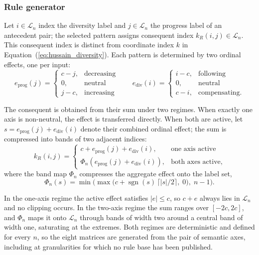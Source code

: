 \subsubsection{Rule generator}

Let $i\in\mathcal{L}_n$ index the diversity label and $j\in\mathcal{L}_n$ the progress label of an antecedent pair; the selected pattern assigns consequent index $k_R(i,j)\in\mathcal{L}_n$. This consequent index is distinct from coordinate index $k$ in Equation~(\ref{eq:hussain_diversity}). Each pattern is determined by two ordinal effects, one per input:
\begin{equation}
\label{eq:axes}
e_{\mathrm{prog}}(j) =
\begin{cases}
c - j, & \text{decreasing} \\
0, & \text{neutral} \\
j - c, & \text{increasing}
\end{cases}
\qquad
e_{\mathrm{div}}(i) =
\begin{cases}
i - c, & \text{following} \\
0, & \text{neutral} \\
c - i, & \text{compensating.}
\end{cases}
\end{equation}

The consequent is obtained from their sum under two regimes. When exactly one axis is non-neutral, the effect is transferred directly. When both are active, let $s=e_{\mathrm{prog}}(j)+e_{\mathrm{div}}(i)$ denote their combined ordinal effect; the sum is compressed into bands of two adjacent indices:
\begin{equation}
\label{eq:generator}
k_R(i,j) =
\begin{cases}
c + e_{\mathrm{prog}}(j) + e_{\mathrm{div}}(i), & \text{one axis active} \\[2pt]
\Phi_n\!\left(e_{\mathrm{prog}}(j) + e_{\mathrm{div}}(i)\right), & \text{both axes active,}
\end{cases}
\end{equation}
where the band map $\Phi_n$ compresses the aggregate effect onto the label set,
\begin{equation}
\label{eq:bandmap}
\Phi_n(s) = \min\!\Big(\max\big(c + \operatorname{sgn}(s)\,\lceil |s|/2 \rceil,\; 0\big),\; n-1\Big).
\end{equation}

In the one-axis regime the active effect satisfies $|e| \le c$, so $c + e$ always lies in $\mathcal{L}_n$ and no clipping occurs. In the two-axis regime the sum ranges over $[-2c, 2c]$, and $\Phi_n$ maps it onto $\mathcal{L}_n$ through bands of width two around a central band of width one, saturating at the extremes. Both regimes are deterministic and defined for every $n$, so the eight matrices are generated from the pair of semantic axes, including at granularities for which no rule base has been published.

